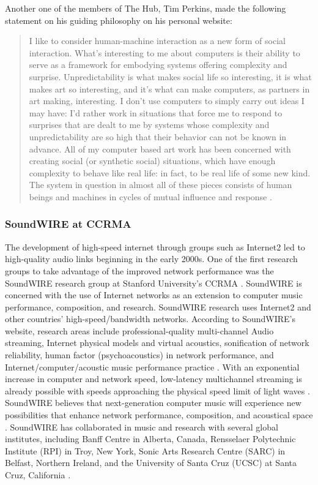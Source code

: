 \documentclass[letterpaper, 12pt]{article}
\begin{document}
%
Another one of the members of The Hub, Tim  Perkins, made the following statement on his guiding philosophy on his personal website:
\begin{quote}
I like to consider human-machine interaction as a new form of social interaction. What's interesting to me about computers is their ability to serve as a framework for embodying systems offering complexity and surprise. Unpredictability is what makes social life so interesting, it is what makes art so interesting, and it's what can make computers, as partners in art making, interesting. I don't use computers to simply carry out ideas I may have: I'd rather work in situations that force me to respond to surprises that are dealt to me by systems whose complexity and unpredictability are so high that their behavior can not be known in advance. All of my computer based art work has been concerned with creating social (or synthetic social) situations, which have enough complexity to behave like real life: in fact, to be real life of some new kind. The system in question in almost all of these pieces consists of human beings and machines in cycles of mutual influence and response \citep{perkins2024about}.
\end{quote}

\subsubsection{SoundWIRE at CCRMA}


%
The development of high-speed internet through groups such as Internet2 led to high-quality audio links beginning in the early 2000s.
%
One of the first research groups to take advantage of the improved network performance was the SoundWIRE research group at Stanford University's CCRMA \citep{chafe2000simplified}.
%
SoundWIRE is concerned with the use of Internet networks as an extension to computer music performance, composition, and research.
%
SoundWIRE research uses Internet2 and other countries' high-speed/bandwidth networks.
%
According to SoundWIRE's website, research areas include professional-quality multi-channel Audio streaming, Internet physical models and virtual acoustics, sonification of network reliability, human factor (psychoacoustics) in network performance, and Internet/computer/acoustic music performance practice \citep{caceres2007soundwire}.
%
With an exponential increase in computer and network speed, low-latency multichannel streaming is already possible with speeds approaching the physical speed limit of light waves \citep{caceres2007soundwire}.
%
SoundWIRE believes that next-generation computer music will experience new possibilities that enhance network performance, composition, and acoustical space \citep{caceres2007soundwire}.
%
SoundWIRE has collaborated in music and research with several global institutes, including Banff Centre in Alberta, Canada, Rensselaer Polytechnic Institute (RPI) in Troy, New York, Sonic Arts Research Centre (SARC) in Belfast, Northern Ireland, and the University of Santa Cruz (UCSC) at Santa Cruz, California \citep{caceres2007soundwire}.
\end{document}
